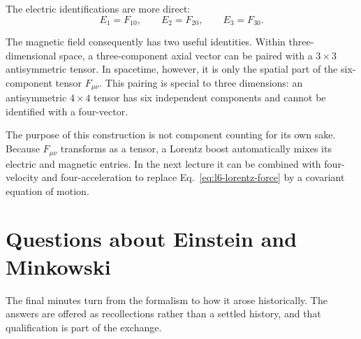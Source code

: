 The electric identifications are more direct:
\begin{equation}
  E_1=F_{10},
  \qquad E_2=F_{20},
  \qquad E_3=F_{30}.
\end{equation}

The magnetic field consequently has two useful identities. Within
three-dimensional space, a three-component axial vector can be paired with a
\(3\times3\) antisymmetric tensor. In spacetime, however, it is only the
spatial part of the six-component tensor \(F_{\mu\nu}\). This pairing is
special to three dimensions: an antisymmetric \(4\times4\) tensor has six
independent components and cannot be identified with a four-vector.

The purpose of this construction is not component counting for its own sake.
Because \(F_{\mu\nu}\) transforms as a tensor, a Lorentz boost automatically
mixes its electric and magnetic entries. In the next lecture it can be
combined with four-velocity and four-acceleration to replace
Eq.~\eqref{eq:l6-lorentz-force} by a covariant equation of motion.

\section{Questions about Einstein and Minkowski}

The final minutes turn from the formalism to how it arose historically. The
answers are offered as recollections rather than a settled history, and that
qualification is part of the exchange.

\begin{classroomqa}
\end{classroomqa}

